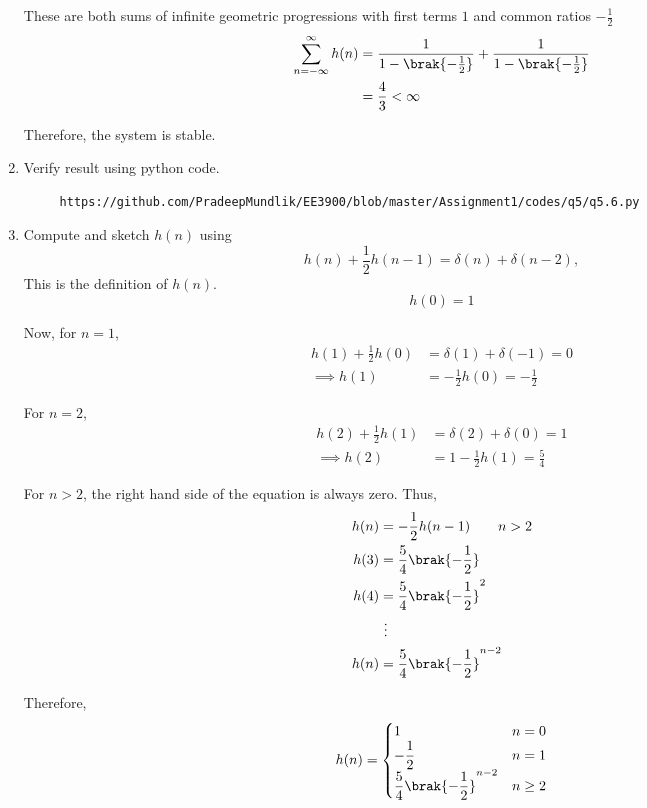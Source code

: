 \documentclass[journal,12pt,twocolumn]{IEEEtran}
\renewcommand\thesection{\arabic{section}}
\begin{document}
\begin{enumerate}[label=\thesection.\arabic*]
These are both sums of infinite geometric progressions with first terms $1$ and common ratios $-\frac12$
\begin{align}
     \sum_{n=-\infty}^{\infty}h(n) &= \frac{1}{1 - \brak{-\frac12}} + \frac{1}{1 - \brak{-\frac12}} \\
     &= \frac{4}{3} < \infty
\end{align}

Therefore, the system is stable.
\item Verify result using python code.\\
\solution 
\begin{lstlisting}
     https://github.com/PradeepMundlik/EE3900/blob/master/Assignment1/codes/q5/q5.6.py

\end{lstlisting}
\item 
Compute and sketch $h(n)$ using 
\begin{equation}
\label{eq:iir_filter_h}
h(n) + \frac{1}{2}h(n-1) = \delta(n) + \delta(n-2), 
\end{equation}
%
This is the definition of $h(n)$.
\\
\solution 
\begin{equation}
     h(0) = 1
\end{equation}

Now, for $n = 1$,
\begin{align}
     h(1) + \frac12 h(0) &= \delta(1) + \delta(-1) = 0 \\
     \implies h(1) &= - \frac{1}{2} h(0) = -\frac{1}{2}
\end{align}

For $n = 2$,
\begin{align}
     h(2) + \frac12 h(1) &= \delta(2) + \delta(0) = 1 \\
     \implies h(2) &= 1 - \frac{1}{2} h(1) = \frac{5}{4}
\end{align}

For $n > 2$, the right hand side of the equation is always zero. Thus,
\begin{align}
     h(n) &= -\frac{1}{2} h(n-1) \qquad n > 2 \\
     h(3) &= \frac{5}{4} \brak{-\frac12} \\
     h(4) &= \frac{5}{4} \brak{-\frac12}^2 \\
     &~\vdots \\
     h(n) &= \frac{5}{4} \brak{-\frac12}^{n-2}
\end{align}

Therefore,
\begin{align}
     h(n) = 
     \begin{cases}
          1 & n = 0 \\
          -\dfrac{1}{2} & n = 1 \\
          \dfrac{5}{4} \brak{-\dfrac12}^{n-2} & n \ge 2
     \end{cases}
\end{align}


\end{enumerate}
\end{document}
